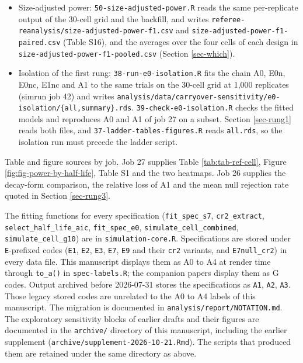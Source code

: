 \documentclass[
  11pt,
]{article}
\begin{document}
\begin{itemize}
  draws 199 parametric resamples per trial, each from its own seed,
  and reruns A4 on each. It ran at commit \texttt{b096f48} as simrun jobs
  zeus 72 (replicates 341 to 500) and joe 19 (171 to 340); replicates
  1 to 170 ran locally after athena 24 failed to start. The guard held
  in 497 of 500 replicates, and 781 of 98,903 resamples (0.8 percent)
  failed to fit and were dropped. Output is checkpointed per replicate
  under \texttt{a4-bootstrap/trials/}.
  \texttt{53-a4-bootstrap-summary.R} combines it into \texttt{a4-bootstrap/all.rds}
  and writes \texttt{referee-reanalysis/a4-bootstrap-coverage.csv} (Section
  \ref{sec-calibration}).
\item
  Size-adjusted power: \texttt{50-size-adjusted-power.R} reads the same
  per-replicate output of the 30-cell grid and the backfill, and
  writes \texttt{referee-reanalysis/size-adjusted-power-f1.csv} and
  \texttt{size-adjusted-power-f1-paired.csv} (Table S16), and the averages
  over the four cells of each design in
  \texttt{size-adjusted-power-f1-pooled.csv} (Section \ref{sec-which}).
\item
  Isolation of the first rung: \texttt{38-run-e0-isolation.R} fits the chain
  A0, E0n, E0nc, E1nc and A1 to the same trials on the 30-cell grid at
  1,000 replicates (simrun job 42) and writes
  \texttt{analysis/data/carryover-sensitivity/e0-isolation/\{all,summary\}.rds}.
  \texttt{39-check-e0-isolation.R} checks the fitted models and reproduces
  A0 and A1 of job 27 on a subset. Section \ref{sec-rung1} reads both
  files, and \texttt{37-ladder-tables-figures.R} reads \texttt{all.rds}, so the
  isolation run must precede the ladder script.
\end{itemize}

Table and figure sources by job. Job 27 supplies Table
\ref{tab:tab-ref-cell}, Figure \ref{fig:fig-power-by-half-life},
Table S1 and the two heatmaps. Job 26 supplies the decay-form comparison,
the relative loss of A1 and the mean null rejection rate quoted in
Section \ref{sec-rung3}.

The fitting functions for every specification (\texttt{fit\_spec\_s7},
\texttt{cr2\_extract}, \texttt{select\_half\_life\_aic}, \texttt{fit\_spec\_e0},
\texttt{simulate\_cell\_combined}, \texttt{simulate\_cell\_g10}) are in
\texttt{simulation-core.R}. Specifications are stored under \texttt{E}-prefixed
codes (\texttt{E1}, \texttt{E2}, \texttt{E3}, \texttt{E7}, \texttt{E9} and their \texttt{cr2} variants, and
\texttt{E7null\_cr2}) in every data file. This manuscript displays them as
A0 to A4 at render time through \texttt{to\_a()} in \texttt{spec-labels.R}; the
companion papers display them as G codes. Output archived before
2026-07-31 stores the specifications as \texttt{A1}, \texttt{A2}, \texttt{A3}. Those legacy
stored codes are unrelated to the A0 to A4 labels of this manuscript.
The migration is documented in \texttt{analysis/report/NOTATION.md}. The
exploratory sensitivity blocks of earlier drafts and their figures are
documented in the \texttt{archive/} directory of this manuscript, including
the earlier supplement (\texttt{archive/supplement-2026-10-21.Rmd}). The scripts that
produced them are retained under the same directory as above.
\end{document}
